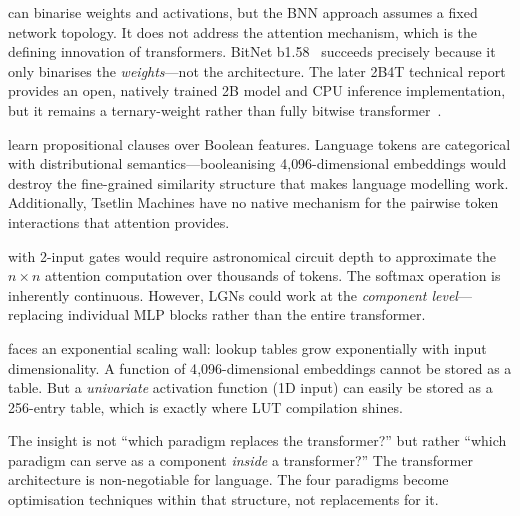 \begin{description}[leftmargin=1em]
  \item[Binary Neural Networks] can binarise weights and activations,
    but the BNN approach assumes a fixed network topology. It does not
    address the attention mechanism, which is the defining innovation
    of transformers. BitNet b1.58~\cite{ma2024bitnet} succeeds
    precisely because it only binarises the \emph{weights}---not the
    architecture. The later 2B4T technical report provides an open,
    natively trained 2B model and CPU inference implementation, but it
    remains a ternary-weight rather than fully bitwise
    transformer~\cite{ma2025bitnet2b4t}.

  \item[Tsetlin Machines] learn propositional clauses over Boolean
    features. Language tokens are categorical with distributional
    semantics---booleanising 4{,}096-dimensional embeddings would
    destroy the fine-grained similarity structure that makes language
    modelling work. Additionally, Tsetlin Machines have no native
    mechanism for the pairwise token interactions that attention
    provides.

  \item[Logic Gate Networks] with 2-input gates would require
    astronomical circuit depth to approximate the $n \times n$
    attention computation over thousands of tokens. The softmax
    operation is inherently continuous. However, LGNs could work at
    the \emph{component level}---replacing individual MLP blocks
    rather than the entire transformer.

  \item[KAN / LUT compilation] faces an exponential scaling wall:
    lookup tables grow exponentially with input dimensionality.
    A function of 4{,}096-dimensional embeddings cannot be stored
    as a table. But a \emph{univariate} activation function (1D input)
    can easily be stored as a 256-entry table, which is exactly where
    LUT compilation shines.
\end{description}

\begin{keyinsight}
The insight is not ``which paradigm replaces the transformer?'' but
rather ``which paradigm can serve as a component \emph{inside} a
transformer?'' The transformer architecture is non-negotiable for
language. The four paradigms become optimisation techniques within
that structure, not replacements for it.
\end{keyinsight}

